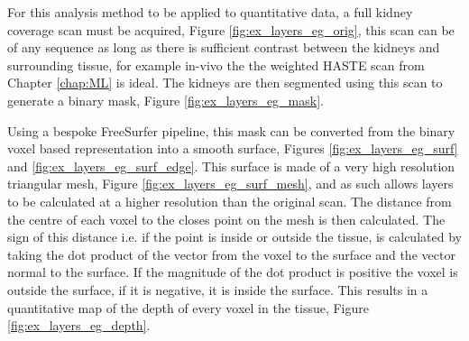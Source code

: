 For this analysis method to be applied to quantitative data, a full kidney coverage scan must be acquired, Figure \ref{fig:ex_layers_eg_orig}, this scan can be of any sequence as long as there is sufficient contrast between the kidneys and surrounding tissue, for example in-vivo the the \ttwo weighted \ac{HASTE} scan from Chapter \ref{chap:ML} is ideal. The kidneys are then segmented using this scan to generate a binary mask, Figure \ref{fig:ex_layers_eg_mask}. 

Using a bespoke FreeSurfer \cite{dale_cortical_1999} pipeline, this mask can be converted from the binary voxel based representation into a smooth surface, Figures \ref{fig:ex_layers_eg_surf} and \ref{fig:ex_layers_eg_surf_edge}. This surface is made of a very high resolution triangular mesh, Figure \ref{fig:ex_layers_eg_surf_mesh}, and as such allows layers to be calculated at a higher resolution than the original scan. The distance from the centre of each voxel to the closes point on the mesh is then calculated. The sign of this distance i.e. if the point is inside or outside the tissue, is calculated by taking the dot product of the vector from the voxel to the surface and the vector normal to the surface. If the magnitude of the dot product is positive the voxel is outside the surface, if it is negative, it is inside the surface. This results in a quantitative map of the depth of every voxel in the tissue, Figure \ref{fig:ex_layers_eg_depth}.

